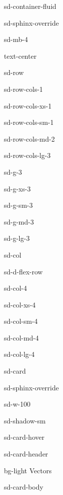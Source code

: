 \documentclass[letterpaper,10pt,english]{jupyterBook}
\let\sphinxpxdimen\pdfpxdimen\else\newdimen\sphinxpxdimen
\begin{document}
\begin{sphinxuseclass}{sd-container-fluid}
\begin{sphinxuseclass}{sd-sphinx-override}
\begin{sphinxuseclass}{sd-mb-4}
\begin{sphinxuseclass}{text-center}
\begin{sphinxuseclass}{sd-row}
\begin{sphinxuseclass}{sd-row-cols-1}
\begin{sphinxuseclass}{sd-row-cols-xs-1}
\begin{sphinxuseclass}{sd-row-cols-sm-1}
\begin{sphinxuseclass}{sd-row-cols-md-2}
\begin{sphinxuseclass}{sd-row-cols-lg-3}
\begin{sphinxuseclass}{sd-g-3}
\begin{sphinxuseclass}{sd-g-xs-3}
\begin{sphinxuseclass}{sd-g-sm-3}
\begin{sphinxuseclass}{sd-g-md-3}
\begin{sphinxuseclass}{sd-g-lg-3}
\begin{sphinxuseclass}{sd-col}
\begin{sphinxuseclass}{sd-d-flex-row}
\begin{sphinxuseclass}{sd-col-4}
\begin{sphinxuseclass}{sd-col-xs-4}
\begin{sphinxuseclass}{sd-col-sm-4}
\begin{sphinxuseclass}{sd-col-md-4}
\begin{sphinxuseclass}{sd-col-lg-4}
\begin{sphinxuseclass}{sd-card}
\begin{sphinxuseclass}{sd-sphinx-override}
\begin{sphinxuseclass}{sd-w-100}
\begin{sphinxuseclass}{sd-shadow-sm}
\begin{sphinxuseclass}{sd-card-hover}
\begin{sphinxuseclass}{sd-card-header}
\begin{sphinxuseclass}{bg-light}
\sphinxAtStartPar
Vectors

\end{sphinxuseclass}
\end{sphinxuseclass}
\begin{sphinxuseclass}{sd-card-body}
\begin{figure}[htbp]
\centering

\noindent\sphinxincludegraphics[width=250\sphinxpxdimen]{{3_dot_product}.svg}
\end{figure}


\end{sphinxuseclass}
\end{sphinxuseclass}
\end{sphinxuseclass}
\end{sphinxuseclass}
\end{sphinxuseclass}
\end{sphinxuseclass}
\end{sphinxuseclass}
\end{sphinxuseclass}
\end{sphinxuseclass}
\end{sphinxuseclass}
\end{sphinxuseclass}
\end{sphinxuseclass}
\end{sphinxuseclass}
\end{sphinxuseclass}
\end{sphinxuseclass}
\end{sphinxuseclass}
\end{sphinxuseclass}
\end{sphinxuseclass}
\end{sphinxuseclass}
\end{sphinxuseclass}
\end{sphinxuseclass}
\end{sphinxuseclass}
\end{sphinxuseclass}
\end{sphinxuseclass}
\end{sphinxuseclass}
\end{sphinxuseclass}
\end{sphinxuseclass}
\end{sphinxuseclass}
\end{document}
